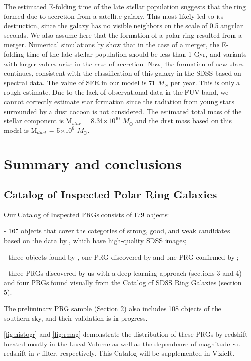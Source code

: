 \documentclass{aa}
\begin{document}
The estimated E-folding time of the late stellar population suggests that the ring formed due to accretion from a satellite galaxy. This most likely led to its destruction, since the galaxy has no visible neighbors on the scale of 0.5 angular seconds. We also assume here that the formation of a polar ring resulted from a merger. Numerical simulations by \cite{Matteo2008} show that in the case of a merger, the E-folding time of the late stellar population should be less than 1 Gyr, and variants with larger values arise in the case of accretion. Now, the formation of new stars continues, consistent with the classification of this galaxy in the SDSS based on spectral data. The value of SFR in our model is 71 $M_{\odot}$ per year. This is only a rough estimate. Due to the lack of observational data in the FUV band, we cannot correctly estimate star formation since the radiation from young stars surrounded by a dust cocoon is not considered. The estimated total mass of the stellar component is M$_{star}$ = 8.34$\times 10^{10}$ $M_{\odot}$ and the dust mass based on this model is M$_{dust}$ = 5$\times 10^{6}$ $M_{\odot}$.

\section{Summary and conclusions}
\noindent
\subsection{Catalog of Inspected Polar Ring Galaxies}

Our Catalog of Inspected PRGs consists of 179 objects: 


- 167 objects that cover the categories of strong, good, and weak candidates based on the data by \citep{Whitmore1990, Moiseev2011, Reshetnikov2019}, which have high-quality SDSS images;

- three objects found by \cite{Skryabina2024}, one PRG discovered by \cite{Akhil2024b} and one PRG confirmed by \cite{Freitas2024};

- three PRGs discovered by us with a deep learning approach (sections 3 and 4) and four PRGs found visually from the Catalog of SDSS Ring Galaxies (section 5). 

The preliminary PRG sample (Section 2) also includes 108 objects of the southern sky, and their validation is in progress.  

\autoref{fig:histogr} and \autoref{fig:rmag} demonstrate the distribution of these PRGs by redshift located mostly in the Local Volume as well as the dependence of magnitude vs. redshift in $r$-filter, respectively. This Catalog will be supplemented in VizieR.
\end{document}
